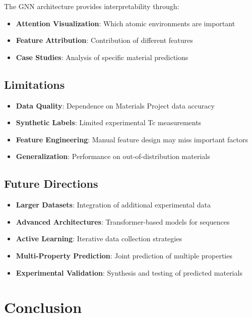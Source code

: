 \documentclass[11pt,a4paper]{article}
\begin{document}
The GNN architecture provides interpretability through:

\begin{itemize}
    \item \textbf{Attention Visualization}: Which atomic environments are important
    \item \textbf{Feature Attribution}: Contribution of different features
    \item \textbf{Case Studies}: Analysis of specific material predictions
\end{itemize}

\subsection{Limitations}

\begin{itemize}
    \item \textbf{Data Quality}: Dependence on Materials Project data accuracy
    \item \textbf{Synthetic Labels}: Limited experimental Tc measurements
    \item \textbf{Feature Engineering}: Manual feature design may miss important factors
    \item \textbf{Generalization}: Performance on out-of-distribution materials
\end{itemize}

\subsection{Future Directions}

\begin{itemize}
    \item \textbf{Larger Datasets}: Integration of additional experimental data
    \item \textbf{Advanced Architectures}: Transformer-based models for sequences
    \item \textbf{Active Learning}: Iterative data collection strategies
    \item \textbf{Multi-Property Prediction}: Joint prediction of multiple properties
    \item \textbf{Experimental Validation}: Synthesis and testing of predicted materials
\end{itemize}

\section{Conclusion}
\end{document}
